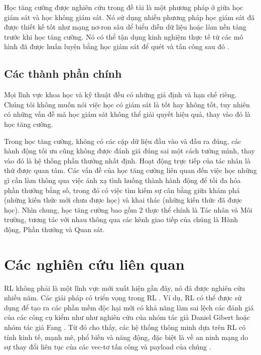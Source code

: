 Học tăng cường được nghiên cứu trong đề tài là một phương pháp ở giữa học giám sát và học không giám sát. Nó sử dụng nhiều phương pháp học giám sát đã được thiết kế tốt như mạng nơ-ron sâu dể biểu diễn dữ liệu hoặc làm nền tảng trước khi học tăng cường. Nó có thể tận dụng kinh nghiệm thực tế từ các mô hình đã được huấn luyện bằng học giám sát để quét và tấn công sau đó \cite{liu2020deep}.


\subsection{Các thành phần chính}
Mọi lĩnh vực khoa học và kỹ thuật đều có những giả định và hạn chế riêng. Chúng tôi không muốn nói việc học có giám sát là tốt hay không tốt, tuy nhiên có những vấn đề mà học giám sát không thể giải quyết hiệu quả, thay vào đó là học tăng cường. 

Trong học tăng cường, không có các cặp dữ liệu đầu vào và đầu ra đúng, các hành động tối ưu cũng không được đánh giá đúng sai một cách tường mình, thay vào đó là hệ thống phần thưởng nhất định. Hoạt động trực tiếp của tác nhân là thứ được quan tâm. Các vấn đề của học tăng cường liên quan đến việc học những gì cần làm thông qua việc ánh xạ tình huống thành hành động để tối đa hóa phần thưởng bằng số, trong đó có việc tìm kiếm sự cân bằng giữa khám phá (những kiến thức mới chưa được học) và khai thác (những kiến thức đã được học). Nhìn chung, học tăng cường bao gồm 2 thực thể chính là Tác nhân và Môi trường, tương tác với nhau thông qua các kênh giao tiếp của chúng là Hành động, Phần thưởng và Quan sát.


\section{Các nghiên cứu liên quan}

RL không phải là một lĩnh vực mới xuất hiện gần đây, nó đã được nghiên cứu nhiều năm. Các giải pháp có triển vọng trong RL . Ví dụ, RL có thể được sử dụng để tạo ra các phần mềm độc hại mới có khả năng làm sai lệch các đánh giá của các công cụ kiểm như như nghiên cứu của nhóm tác giả Daniel Gibert \cite{gibert2022enhancing} hoặc nhóm tác giả Fang \cite{fang2019evading}. Từ đó cho thấy, các hệ thống thông minh dựa trên RL có tính kinh tế, mạnh mẽ, phổ biến và năng động, đặc biệt là về an ninh mạng do sự thay đổi liên tục của các vec-tơ tấn công và payload của chúng \cite{adawadkar2022cyber}. 


